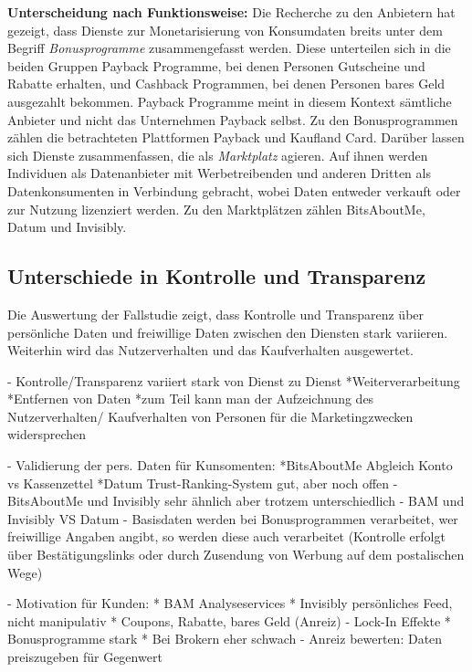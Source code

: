\noindent \textbf{Unterscheidung nach Funktionsweise:} Die Recherche zu den Anbietern hat gezeigt, dass Dienste zur Monetarisierung von Konsumdaten breits unter dem Begriff \textit{Bonusprogramme} zusammengefasst werden. Diese unterteilen sich in die beiden Gruppen Payback Programme, bei denen Personen Gutscheine und Rabatte erhalten, und Cashback Programmen, bei denen Personen bares Geld ausgezahlt bekommen. Payback Programme meint in diesem Kontext sämtliche Anbieter und nicht das Unternehmen Payback selbst. Zu den Bonusprogrammen zählen die betrachteten Plattformen Payback und Kaufland Card. Darüber lassen sich Dienste zusammenfassen, die als \textit{Marktplatz} agieren. Auf ihnen werden Individuen als Datenanbieter mit Werbetreibenden und anderen Dritten als Datenkonsumenten in Verbindung gebracht, wobei Daten entweder verkauft oder zur Nutzung lizenziert werden. Zu den Marktplätzen zählen BitsAboutMe, Datum und Invisibly. \newline

\subsection{Unterschiede in Kontrolle und Transparenz}
Die Auswertung der Fallstudie zeigt, dass Kontrolle und Transparenz über persönliche Daten und freiwillige Daten zwischen den Diensten stark variieren. Weiterhin wird das Nutzerverhalten und das Kaufverhalten ausgewertet.

- Kontrolle/Transparenz variiert stark von Dienst zu Dienst
    *Weiterverarbeitung
    *Entfernen von Daten
    *zum Teil kann man der Aufzeichnung des Nutzerverhalten/ Kaufverhalten von Personen für die Marketingzwecken widersprechen

- Validierung der pers. Daten für Kunsomenten: 
    *BitsAboutMe Abgleich Konto vs Kassenzettel
    *Datum Trust-Ranking-System gut, aber noch offen
- BitsAboutMe und Invisibly sehr ähnlich aber trotzem unterschiedlich
- BAM und Invisibly VS Datum
- Basisdaten werden bei Bonusprogrammen verarbeitet, wer freiwillige Angaben angibt, so werden diese auch verarbeitet (Kontrolle erfolgt über Bestätigungslinks oder durch Zusendung von Werbung auf dem postalischen Wege)



- Motivation für Kunden:
    * BAM Analyseservices
    * Invisibly persönliches Feed, nicht manipulativ
    * Coupons, Rabatte, bares Geld (Anreiz)
- Lock-In Effekte
    * Bonusprogramme stark
    * Bei Brokern eher schwach
- Anreiz bewerten: Daten preiszugeben für Gegenwert

